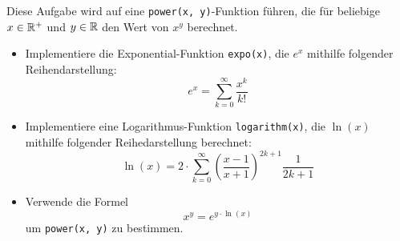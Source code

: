 \begin{aufg}
Diese Aufgabe wird auf eine \verb|power(x, y)|-Funktion führen, die für beliebige $x \in \mathbb{R}^+$ und $y \in \mathbb{R}$ den Wert von $x^y$ berechnet.
\begin{itemize}[leftmargin=*]
\item Implementiere die Exponential-Funktion \verb|expo(x)|, die $e^x$ mithilfe folgender Reihendarstellung: \[
e^x = \sum_{k=0}^\infty \frac{x^k}{k!} \]
\item Implementiere eine Logarithmus-Funktion \verb|logarithm(x)|, die $\ln(x)$ mithilfe folgender Reihedarstellung berechnet: \[
\ln(x) = 2\cdot \sum_{k = 0}^\infty \left(\frac{x-1}{x+1}\right)^{2k + 1} \frac{1}{2k + 1} \]
\item Verwende die Formel \[
x^y = e^{y \cdot \ln(x)} \] um \verb|power(x, y)| zu bestimmen.
\end{itemize}
\end{aufg}
